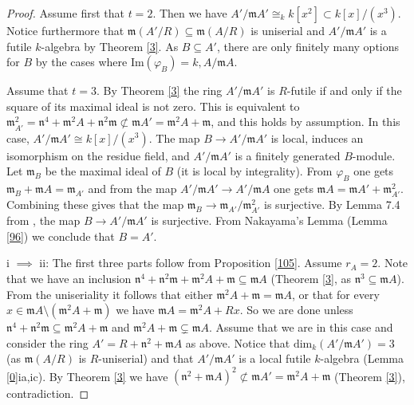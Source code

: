 \documentclass{amsart}
\theoremstyle{plain}
\theoremstyle{definition}
\begin{document}
\begin{proof}
Assume first that $t=2$. Then we have $A'/{\mathfrak{m}} A' \cong_k k[x^2] \subset k[x]/(x^3)$. Notice furthermore that  ${\mathfrak{m}} (A'/R) \subseteq {\mathfrak{m}} (A/R)$ is uniserial and $A'/{\mathfrak{m}} A'$ is a futile
$k$-algebra by Theorem \ref{3}. As $B \subseteq A'$, there are only finitely many options for $B$ by the cases where $\mathrm{Im}(\varphi_B)=k,A/{\mathfrak{m}}
A$.

Assume that $t=3$. By Theorem \ref{3} the ring $A'/{\mathfrak{m}} A'$ is $R$-futile if and only if the square of its maximal ideal is not zero. This is equivalent
to ${\mathfrak{m}}_{A'}^2=\mathfrak{n}^4+{\mathfrak{m}}^2 A + \mathfrak{n}^2 {\mathfrak{m}} \not \subset {\mathfrak{m}} A'={\mathfrak{m}}^2 A + {\mathfrak{m}}$, and this holds by assumption. In this case, $A'/{\mathfrak{m}} A'
\cong k[x]/(x^3)$. The map $B \to A'/{\mathfrak{m}} A'$ is local, induces an isomorphism on the residue field, and $A'/{\mathfrak{m}} A'$ is a finitely generated $B$-module.
Let ${\mathfrak{m}}_B$ be the maximal ideal of $B$ (it is local by integrality). From $\varphi_B$ one gets ${\mathfrak{m}}_B+{\mathfrak{m}} A={\mathfrak{m}}_{A'}$ and from the map $A'/{\mathfrak{m}} A' \to
A'/{\mathfrak{m}} A$ one gets ${\mathfrak{m}} A={\mathfrak{m}} A'+{\mathfrak{m}}_{A'}^2$. Combining these gives that the map ${\mathfrak{m}}_{B} \to {\mathfrak{m}}_{A'}/{\mathfrak{m}}_{A'}^2$ is surjective.
By Lemma 7.4 from \cite{HA}, the map $B \to A'/{\mathfrak{m}} A'$ is surjective. From Nakayama's Lemma (Lemma \ref{96}) we conclude that $B=A'$. 

i $\implies$ ii: The first three parts follow from Proposition \ref{105}. Assume $r_A=2$. Note that we have an inclusion
$\mathfrak{n}^4+\mathfrak{n}^2{\mathfrak{m}}+{\mathfrak{m}}^2A+{\mathfrak{m}}\subseteq {\mathfrak{m}}
A$ (Theorem \ref{3}, as $\mathfrak{n}^3 \subseteq {\mathfrak{m}} A$). From the uniseriality it follows that either ${\mathfrak{m}}^2 A+{\mathfrak{m}} = {\mathfrak{m}} A$, or that for every $x \in {\mathfrak{m}}
A \setminus
\left({\mathfrak{m}}^2A +{\mathfrak{m}} \right)$ we have ${\mathfrak{m}} A={\mathfrak{m}}^2 A+ Rx$. So we are done unless $\mathfrak{n^4}+\mathfrak{n}^2 {\mathfrak{m}} \subseteq {\mathfrak{m}}^2 A+{\mathfrak{m}}$ and ${\mathfrak{m}}^2 A+{\mathfrak{m}}
\subsetneq {\mathfrak{m}} A$. Assume that we are in this case and consider
the ring $A'=R+\mathfrak{n}^2+{\mathfrak{m}} A$ as above. Notice that $\mathrm{dim}_k(A'/{\mathfrak{m}} A')=3$ (as ${\mathfrak{m}}(A/R)$ is $R$-uniserial) and that $A'/{\mathfrak{m}} A'$ is a local futile $k$-algebra (Lemma \ref{0}ia,ic). By Theorem \ref{3} we have $(\mathfrak{n}^2+{\mathfrak{m}} A)^2
\not \subset  {\mathfrak{m}} A'={\mathfrak{m}}^2 A+{\mathfrak{m}}$ (Theorem \ref{3}), contradiction.
\end{proof}
\end{document}
